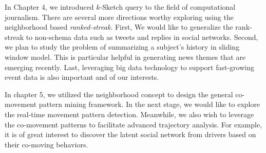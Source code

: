 In Chapter 4, we introduced $k$-Sketch query
to the field of computational journalism. There are several more directions
worthy exploring using the neighborhood based \emph{ranked-streak}. First,
We would like to generalize the rank-streak to non-schema data 
such as tweets and replies in social networks. 
Second, we plan to study the problem of summarizing a subject's history
in sliding window model. This is particular helpful in generating news themes that
are emerging recently. Last, leveraging big data technology 
to support fast-growing event data is also important and of our interests.
%


In chapter 5, we utilized the neighborhood concept to
design the general co-movement pattern mining framework.
In the next stage, we would like to explore the real-time 
movement pattern detection. Meanwhile, we also wish
to leverage the co-movement patterns to facilitate advanced
trajectory analysis. For example, it is of great interest
to discover the latent social network from drivers based 
on their co-moving behaviors.  




%
%

